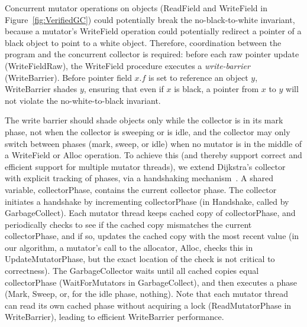Concurrent mutator operations on objects (ReadField and WriteField in Figure~\ref{fig:VerifiedGC})
could potentially break the no-black-to-white invariant,
because a mutator's WriteField operation could potentially redirect a pointer of a black object to point to a white object.
Therefore, coordination between the program and the concurrent collector is required:
before each raw pointer update (WriteFieldRaw), the WriteField procedure executes a {\em write-barrier} (WriteBarrier).
Before pointer field $x.f$ is set to reference an object $y$,
WriteBarrier shades $y$, ensuring that even if $x$ is black, a pointer from $x$ to $y$
will not violate the no-white-to-black invariant.

The write barrier should shade objects only while the collector is in its mark phase,
not when the collector is sweeping or is idle, and the collector may only switch between phases (mark, sweep, or idle)
when no mutator is in the middle of a WriteField or Alloc operation.
To achieve this (and thereby support correct and efficient support for multiple mutator threads),
we extend Dijkstra's collector with explicit tracking of phases, via a handshaking mechanism~\cite{doli93,doli94}.
A shared variable, collectorPhase, contains the current collector phase.
The collector initiates a handshake by incrementing collectorPhase (in Handshake, called by GarbageCollect).
Each mutator thread keeps cached copy of collectorPhase, and periodically checks to see if
the cached copy mismatches the current collectorPhase, and if so, updates the cached copy
with the most recent value
(in our algorithm, a mutator's call to the allocator, Alloc, checks this in UpdateMutatorPhase,
but the exact location of the check is not critical to correctness).
The GarbageCollector waits until all cached copies equal collectorPhase (WaitForMutators in GarbageCollect),
and then executes a phase (Mark, Sweep, or, for the idle phase, nothing).
Note that each mutator thread can read its own cached phase without acquiring a lock (ReadMutatorPhase in WriteBarrier),
leading to efficient WriteBarrier performance.

